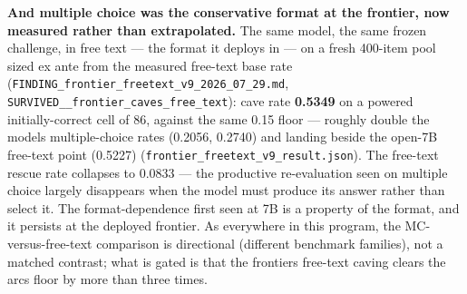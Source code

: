 \documentclass[11pt]{article}
\begin{document}
\textbf{And multiple choice was the conservative format at the frontier, now measured rather than extrapolated.} The same model, the same frozen challenge, in free text --- the format it deploys in --- on a fresh 400-item pool sized ex ante from the measured free-text base rate (\texttt{FINDING\_frontier\_freetext\_v9\_2026\_07\_29.md}, \texttt{SURVIVED\_\_frontier\_caves\_free\_text}): cave rate \textbf{0.5349} on a powered initially-correct cell of 86, against the same 0.15 floor --- roughly double the model\textquotesingle s multiple-choice rates (0.2056, 0.2740) and landing beside the open-7B free-text point (0.5227) (\texttt{frontier\_freetext\_v9\_result.json}). The free-text rescue rate collapses to 0.0833 --- the productive re-evaluation seen on multiple choice largely disappears when the model must produce its answer rather than select it. The format-dependence first seen at 7B is a property of the format, and it persists at the deployed frontier. As everywhere in this program, the MC-versus-free-text comparison is directional (different benchmark families), not a matched contrast; what is gated is that the frontier\textquotesingle s free-text caving clears the arc\textquotesingle s floor by more than three times.
\end{document}
